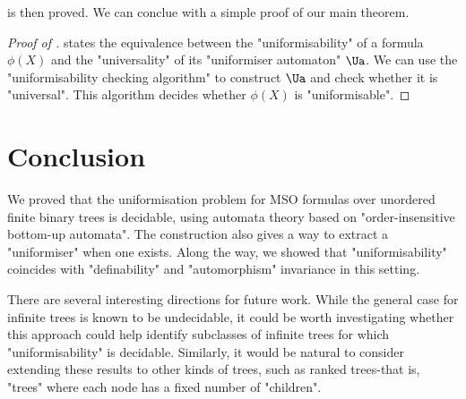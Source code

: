 \documentclass[a4paper,UKenglish,cleveref, autoref, thm-restate]{lipics-v2021}
\begin{document}
 is then proved. We can conclue with a simple proof of our main theorem.

\begin{proof}[Proof of ]
	 states the equivalence between the "uniformisability" of a formula $\phi(X)$ and the "universality" of its "uniformiser automaton" $\Ua$.
	We can use the "uniformisability checking algorithm" to construct $\Ua$ and check whether it is "universal". This algorithm decides whether $\phi(X)$ is "uniformisable".
\end{proof}

\section{Conclusion}\label{sec:conclusion}

We proved that the uniformisation problem for MSO formulas over unordered finite binary trees is decidable, using automata theory based
on "order-insensitive bottom-up automata". The construction also gives a way to extract a "uniformiser" when one exists. Along the way,
we showed that "uniformisability" coincides with "definability" and "automorphism" invariance in this setting.

There are several interesting directions for future work. While the general case for infinite trees is known to be undecidable,
it could be worth investigating whether this approach could help identify subclasses of infinite trees for which "uniformisability" is decidable.
Similarly, it would be natural to consider extending these results to other kinds of trees, such as ranked trees-that is, "trees" where each node has a fixed number of "children".







\end{document}
